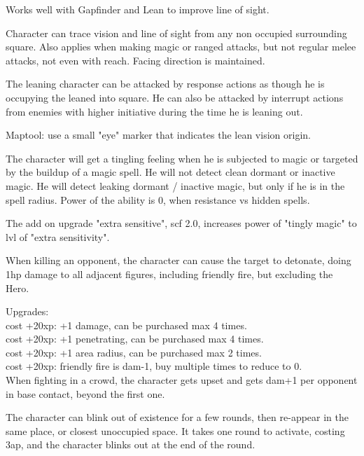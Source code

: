 Works well with Gapfinder and Lean to improve line of sight.


 Character can trace vision and line of sight from any non occupied surrounding square. Also applies when making magic or ranged attacks, but not regular melee attacks, not even with reach. Facing direction is maintained.

The leaning character can be attacked by response actions as though he is occupying the leaned into square. He can also be attacked by interrupt actions from enemies with higher initiative during the time he is leaning out.

\noindent
Maptool: use a small "eye" marker that indicates the lean vision origin.


 The character will get a tingling feeling when he is subjected to magic or targeted by the buildup of a magic spell. He will not detect clean dormant or inactive magic. He will detect leaking dormant / inactive magic, but only if he is in the spell radius.
Power of the ability is 0, when resistance vs hidden spells.

The add on upgrade "extra sensitive", scf 2.0, increases power of "tingly magic" to lvl of "extra sensitivity".


 When killing an opponent, the character can cause the target to detonate, doing 1hp damage to all adjacent figures, including friendly fire, but excluding the Hero.

Upgrades:\\
cost +20xp: +1 damage, can be purchased max 4 times. \\
cost +20xp: +1 penetrating, can be purchased max 4 times. \\
cost +20xp: +1 area radius, can be purchased max 2 times. \\
cost +20xp: friendly fire is dam-1, buy multiple times to reduce to 0. \\


 When fighting in a crowd, the character gets upset and gets dam+1 per opponent in base contact, beyond the first one.


 The character can blink out of existence for a few rounds, then re-appear in the same place, or closest unoccupied space. It takes one round to activate, costing 3ap, and the character blinks out at the end of the round.

